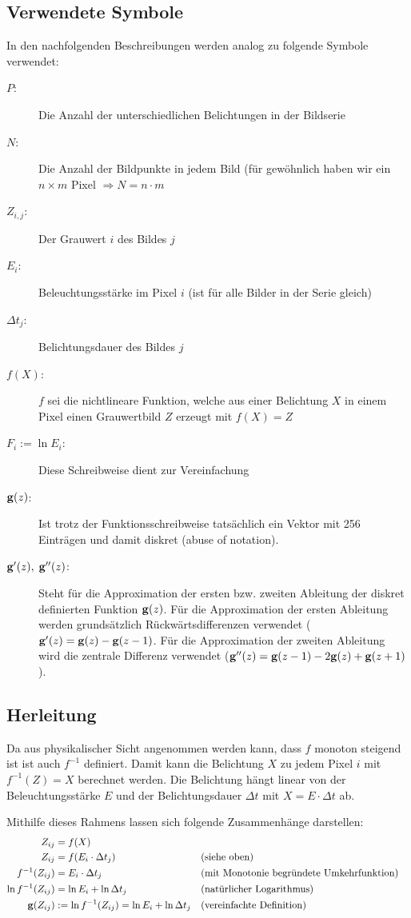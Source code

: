 \subsection{Verwendete Symbole}
In den nachfolgenden Beschreibungen werden analog zu \cite{paper} folgende Symbole verwendet:
\begin{description}
\item[$P$:] Die Anzahl der unterschiedlichen Belichtungen in der Bildserie
\item[$N$:] Die Anzahl der Bildpunkte in jedem Bild (für gewöhnlich haben wir ein $n \times m$ Pixel $\Rightarrow N = n \cdot m$
\item[$Z_{i,j}$:] Der Grauwert $i$ des Bildes $j$
\item[$E_i$:] Beleuchtungsstärke im Pixel $i$ (ist für alle Bilder in der Serie gleich)
\item[$\Delta t_j$:] Belichtungsdauer des Bildes $j$
\item[$f(X)$:] $f$ sei die nichtlineare Funktion, welche aus einer Belichtung $X$ in einem Pixel einen Grauwertbild $Z$ erzeugt mit $f(X) = Z$
\item[$F_i := \ln E_i$:] Diese Schreibweise dient zur Vereinfachung
\item[$\mathbf g(z)$:] Ist trotz der Funktionsschreibweise tatsächlich ein Vektor mit 256 Einträgen und damit diskret (abuse of notation).
\item[$\mathbf{g}'(z), \; \mathbf{g}''(z) $:] Steht für die Approximation der ersten bzw. zweiten Ableitung der diskret definierten Funktion $\mathbf g(z)$. Für die Approximation der ersten Ableitung werden grundsätzlich Rückwärtsdifferenzen verwendet ($\mathbf g'(z) = \mathbf g(z) - \mathbf g(z-1)$. Für die Approximation der zweiten Ableitung wird die zentrale Differenz verwendet ($ \mathbf g''(z) = \mathbf g(z-1)-2\mathbf g(z)+\mathbf g(z+1)$).\\

\end{description}

\subsection{Herleitung}
Da aus physikalischer Sicht angenommen werden kann, dass $f$ monoton steigend ist ist auch $f^{-1}$ definiert. Damit kann die Belichtung $X$ zu jedem Pixel $i$ mit $f^{-1}(Z) = X$ berechnet werden. Die Belichtung hängt linear von der Beleuchtungsstärke $E$ und der Belichtungsdauer $\Delta t$ mit $X = E \cdot \Delta t$ ab.

Mithilfe dieses Rahmens lassen sich folgende Zusammenhänge darstellen:
\begin{align*}
Z_{ij} &= f(X)\\
Z_{ij} &=f(E_i \cdot \Delta t_j)&&\text{(siehe oben)}\\
f^{-1}(Z_{ij}) &= E_i \cdot \Delta t_j & &\text{(mit Monotonie begründete Umkehrfunktion)}\\
\ln f^{-1}(Z_{ij}) &= \ln E_i + \ln \Delta t_j&&\text{(natürlicher Logarithmus)}\\
\mathbf g(Z_{ij}) &:= \ln f^{-1}(Z_{ij}) = \ln E_i + \ln \Delta t_j && \text{(vereinfachte Definition)}\\
\end{align*}


